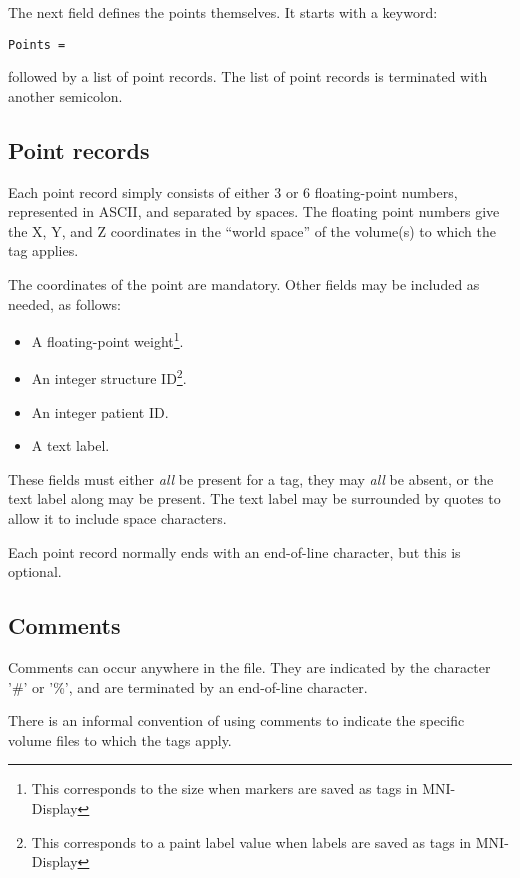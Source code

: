 \documentclass{article}
\begin{document}
The next field defines the points themselves. It starts with a keyword:
\begin{verbatim}
Points =
\end{verbatim}
followed by a list of point records. The list of point records is
terminated with another semicolon.

\subsection{Point records}
Each point record simply consists of either 3 or 6 floating-point
numbers, represented in ASCII, and separated by spaces. The floating
point numbers give the X, Y, and Z coordinates in the ``world space'' of
the volume(s) to which the tag applies.

The coordinates of the point are mandatory. Other fields may be included
as needed, as follows:
\begin{itemize}
\item A floating-point weight\footnote{This corresponds to the size when markers are saved as tags in MNI-Display}.
\item An integer structure ID\footnote{This corresponds to a paint label value
  when labels are saved as tags in MNI-Display}.
\item An integer patient ID.
\item A text label.
\end{itemize}

These fields must either {\em all} be present for a tag, they may {\em
 all} be absent, or the text label along may be present. The text label
may be surrounded by quotes to allow it to include space characters.

Each point record normally ends with an end-of-line character, but this
is optional.

\subsection{Comments}
Comments can occur anywhere in the file. They are indicated by the
character '\#' or '\%', and are terminated by an end-of-line character.

There is an informal convention of using comments to indicate the
specific volume files to which the tags apply.
\end{document}
